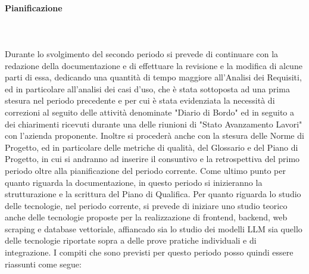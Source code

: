 \paragraph{Pianificazione} \hspace{1cm}
\\ \hspace{1cm} \\
Durante lo svolgimento del secondo periodo si prevede di continuare con la redazione della documentazione e di effettuare la revisione e la modifica di alcune parti di essa, dedicando una quantità di tempo maggiore all'Analisi dei Requisiti, ed in particolare all'analisi dei casi d'uso, che è stata sottoposta ad una prima stesura nel periodo precedente e per cui è stata evidenziata la necessità di correzioni al seguito delle attività denominate "Diario di Bordo" ed in seguito a dei chiarimenti ricevuti durante una delle riunioni di "Stato Avanzamento Lavori" con l'azienda proponente.
Inoltre si procederà anche con la stesura delle Norme di Progetto, ed in particolare delle metriche di qualità, del Glossario e del Piano di Progetto, in cui si andranno ad inserire il consuntivo e la retrospettiva del primo periodo oltre alla pianificazione del periodo corrente.
Come ultimo punto per quanto riguarda la documentazione, in questo periodo si inizieranno la strutturazione e la scrittura del Piano di Qualifica.
Per quanto riguarda lo studio delle tecnologie, nel periodo corrente, si prevede di iniziare uno studio teorico anche delle tecnologie proposte per la realizzazione di frontend, backend, web scraping e database vettoriale, affiancado sia lo studio dei modelli LLM sia quello delle tecnologie riportate sopra a delle prove pratiche individuali e di integrazione.
I compiti che sono previsti per questo periodo posso quindi essere riassunti come segue:
